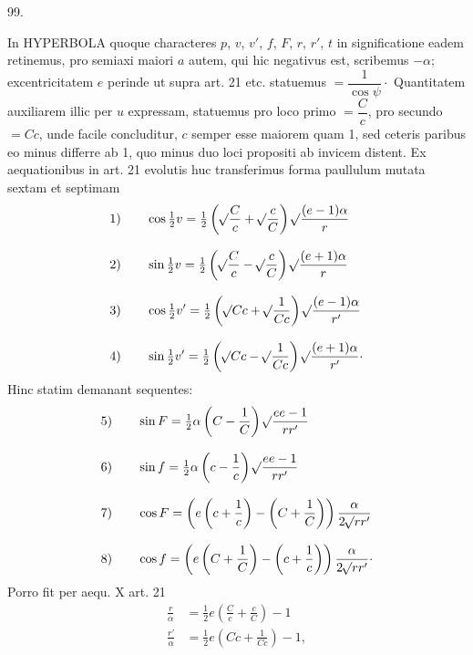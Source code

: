\par{}\medskip
\hypertarget{native-137-article099}{}
\begin{center}99.\end{center}
In HYPERBOLA quoque characteres $p$, $v$, $v'$, $f$, $F$, $r$, $r'$, $t$ in significatione eadem retinemus, pro semiaxi maiori $a$ autem, qui hic negativus est, scribemus $-\alpha$; excentricitatem $e$ perinde ut supra art. 21 etc. statuemus $=\dfrac1{\cos\psi}\mathpunct{\cdot}$ Quantitatem auxiliarem illic per $u$ expressam, statuemus pro loco primo $=\dfrac Cc$, pro secundo $=Cc$, unde facile concluditur, $c$ semper esse maiorem quam 1, sed ceteris paribus eo minus differre ab 1, quo minus duo loci propositi ab invicem distent. Ex aequationibus in art. 21 evolutis huc transferimus forma paullulum mutata sextam et septimam
\[
\begin{aligned}
\mathrm{1)}\qquad&\cos\tfrac12v=\tfrac12\left(\BareRoot{\dfrac Cc}+\BareRoot{\dfrac cC}\right)\BareRoot{\dfrac{(e-1)\alpha}r}\\[.8em]
\mathrm{2)}\qquad&\sin\tfrac12v=\tfrac12\left(\BareRoot{\dfrac Cc}-\BareRoot{\dfrac cC}\right)\BareRoot{\dfrac{(e+1)\alpha}r}\\[.8em]
\mathrm{3)}\qquad&\cos\tfrac12v'=\tfrac12\left(\BareRoot{Cc}+\BareRoot{\dfrac1{Cc}}\right)\BareRoot{\dfrac{(e-1)\alpha}{r'}}\\[.8em]
\mathrm{4)}\qquad&\sin\tfrac12v'=\tfrac12\left(\BareRoot{Cc}-\BareRoot{\dfrac1{Cc}}\right)\BareRoot{\dfrac{(e+1)\alpha}{r'}}\mathpunct{\cdot}
\end{aligned}
\]
\noindent Hinc statim demanant sequentes:
\[
\begin{aligned}
\mathrm{5)}\qquad&\sin F=\tfrac12\alpha\left(C-\dfrac1C\right)\mathord{{}^{}\!\surd}\dfrac{ee-1}{rr'}\\[.8em]
\mathrm{6)}\qquad&\sin f=\tfrac12\alpha\left(c-\dfrac1c\right)\mathord{{}^{}\!\surd}\dfrac{ee-1}{rr'}\\[.8em]
\mathrm{7)}\qquad&\cos F=\left(e\left(c+\dfrac1c\right)-\left(C+\dfrac1C\right)\right)\dfrac\alpha{2\mathord{{}^{}\!\surd}rr'}\\[.8em]
\mathrm{8)}\qquad&\cos f=\left(e\left(C+\dfrac1C\right)-\left(c+\dfrac1c\right)\right)\dfrac\alpha{2\mathord{{}^{}\!\surd}rr'}\mathpunct{\cdot}
\end{aligned}
\]
\noindent Porro fit per aequ. X art. 21
\[
\begin{aligned}
\frac r\alpha&=\tfrac12e\left(\frac Cc+\frac cC\right)-1\\[.6em]
\frac{r'}\alpha&=\tfrac12e\left(Cc+\frac1{Cc}\right)-1,
\end{aligned}
\]
